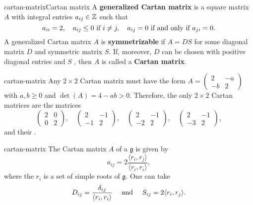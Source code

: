\begin{topic}{cartan-matrix}{Cartan matrix}
    A \textbf{generalized Cartan matrix} is a square matrix $A$ with integral entries $a_{ij} \in \mathbb{Z}$ such that
    \[ a_{ii} = 2, \quad a_{ij} \le 0 \textup{ if } i \ne j, \quad a_{ij} = 0 \textup{ if and only if } a_{ji} = 0 . \]
    A generalized Cartan matrix $A$ is \textbf{symmetrizable} if $A = DS$ for some diagonal matrix $D$ and symmetric matrix $S$. If, moreover, $D$ can be chosen with positive diagonal entries and $S$ , then $A$ is called a \textbf{Cartan matrix}.
\end{topic}


\begin{example}{cartan-matrix}
    Any $2 \times 2$ Cartan matrix must have the form $A = \begin{pmatrix} 2 & -a \\ -b & 2 \end{pmatrix}$ with $a, b \ge 0$ and $\det(A) = 4 - ab > 0$. Therefore, the only $2 \times 2$ Cartan matrices are the matrices
    \[ \begin{pmatrix} 2 & 0 \\ 0 & 2 \end{pmatrix}, \quad \begin{pmatrix} 2 & -1 \\ -1 & 2 \end{pmatrix}, \quad \begin{pmatrix} 2 & -1 \\ -2 & 2 \end{pmatrix}, \quad \begin{pmatrix} 2 & -1 \\ -3 & 2 \end{pmatrix} , \]
    and their .
\end{example}

\begin{example}{cartan-matrix}
    The Cartan matrix $A$ of a  $\mathfrak{g}$ is given by
    \[ a_{ij} = 2 \frac{\langle r_i, r_j \rangle}{\langle r_i, r_i \rangle} , \]
    where the $r_i$ is a set of simple roots of $\mathfrak{g}$. One can take
    \[ D_{ij} = \frac{\delta_{ij}}{\langle r_i, r_i \rangle} \quad \textup{ and } \quad S_{ij} = 2 \langle r_i, r_j \rangle . \]
\end{example}
